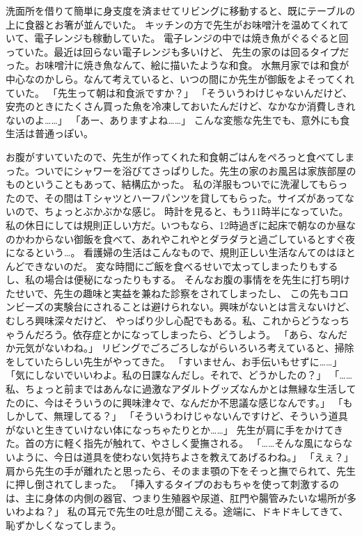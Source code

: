洗面所を借りて簡単に身支度を済ませてリビングに移動すると、既にテーブルの上に食器とお箸が並んでいた。
キッチンの方で先生がお味噌汁を温めてくれていて、電子レンジも稼動していた。
電子レンジの中では焼き魚がぐるぐると回っていた。最近は回らない電子レンジも多いけど、
先生の家のは回るタイプだった。お味噌汁に焼き魚なんて、絵に描いたような和食。
水無月家では和食が中心なのかしら。なんて考えていると、いつの間にか先生が御飯をよそってくれていた。
「先生って朝は和食派ですか？」
「そういうわけじゃないんだけど、安売のときにたくさん買った魚を冷凍しておいたんだけど、なかなか消費しきれないのよ……」
「あー、ありますよね……」
こんな変態な先生でも、意外にも食生活は普通っぽい。

お腹がすいていたので、先生が作ってくれた和食朝ごはんをぺろっと食べてしまった。ついでにシャワーを浴びてさっぱりした。先生の家のお風呂は家族部屋のものということもあって、結構広かった。
私の洋服もついでに洗濯してもらったので、その間はＴシャツとハーフパンツを貸してもらった。サイズがあってないので、ちょっとぶかぶかな感じ。
時計を見ると、もう11時半になっていた。
私の休日にしては規則正しい方だ。いつもなら、12時過ぎに起床で朝なのか昼なのかわからない御飯を食べて、あれやこれやとダラダラと過ごしているとすぐ夜になるという…。
看護婦の生活はこんなもので、規則正しい生活なんてのはほとんどできないのだ。
変な時間にご飯を食べるせいで太ってしまったりもするし、私の場合は便秘になったりもする。
そんなお腹の事情をを先生に打ち明けたせいで、先生の趣味と実益を兼ねた診察をされてしまったし、
この先もコロンビーズの実験台にされることは避けられない。興味がないとは言えないけど、むしろ興味深々だけど、
やっぱり少し心配でもある。私、これからどうなっちゃうんだろう。依存症とかになってしまったら、どうしよう。
「あら、なんだか元気がないわね。」
リビングでごろごろしながらいろいろ考えていると、掃除をしていたらしい先生がやってきた。
「すいません、お手伝いもせずに……」
「気にしないでいいわよ。私の日課なんだし。それで、どうかしたの？」
「……私、ちょっと前まではあんなに過激なアダルトグッズなんかとは無縁な生活してたのに、今はそういうのに興味津々で、なんだか不思議な感じなんです。」
「もしかして、無理してる？」
「そういうわけじゃないんですけど、そういう道具がないと生きていけない体になっちゃたりとか……」
先生が肩に手をかけてきた。首の方に軽く指先が触れて、やさしく愛撫される。
「……そんな風にならないように、今日は道具を使わない気持ちよさを教えてあげるわね。」
「えぇ？」
肩から先生の手が離れたと思ったら、そのまま顎の下をそっと撫でられて、先生に押し倒されてしまった。
「挿入するタイプのおもちゃを使って刺激するのは、主に身体の内側の器官、つまり生殖器や尿道、肛門や腸管みたいな場所が多いわよね？」
私の耳元で先生の吐息が聞こえる。途端に、ドキドキしてきて、恥ずかしくなってしまう。
